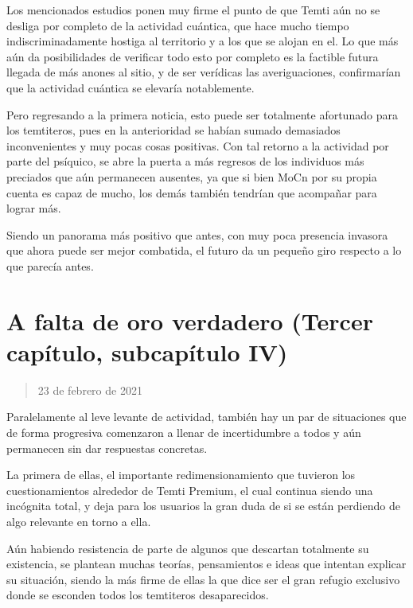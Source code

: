 \documentclass[
  spanish,
]{book}
\begin{document}
Los mencionados estudios ponen muy firme el punto de que Temti aún no se desliga por completo de la actividad cuántica, que hace mucho tiempo indiscriminadamente hostiga al territorio y a los que se alojan en el. Lo que más aún da posibilidades de verificar todo esto por completo es la factible futura llegada de más anones al sitio, y de ser verídicas las averiguaciones, confirmarían que la actividad cuántica se elevaría notablemente.

Pero regresando a la primera noticia, esto puede ser totalmente afortunado para los temtiteros, pues en la anterioridad se habían sumado demasiados inconvenientes y muy pocas cosas positivas. Con tal retorno a la actividad por parte del psíquico, se abre la puerta a más regresos de los individuos más preciados que aún permanecen ausentes, ya que si bien MoCn por su propia cuenta es capaz de mucho, los demás también tendrían que acompañar para lograr más.

Siendo un panorama más positivo que antes, con muy poca presencia invasora que ahora puede ser mejor combatida, el futuro da un pequeño giro respecto a lo que parecía antes.

\hypertarget{a-falta-de-oro-verdadero-tercer-capuxedtulo-subcapuxedtulo-iv}{%
\section{A falta de oro verdadero (Tercer capítulo, subcapítulo IV)}\label{a-falta-de-oro-verdadero-tercer-capuxedtulo-subcapuxedtulo-iv}}

\begin{quote}
23 de febrero de 2021
\end{quote}

Paralelamente al leve levante de actividad, también hay un par de situaciones que de forma progresiva comenzaron a llenar de incertidumbre a todos y aún permanecen sin dar respuestas concretas.

La primera de ellas, el importante redimensionamiento que tuvieron los cuestionamientos alrededor de Temti Premium, el cual continua siendo una incógnita total, y deja para los usuarios la gran duda de si se están perdiendo de algo relevante en torno a ella.

Aún habiendo resistencia de parte de algunos que descartan totalmente su existencia, se plantean muchas teorías, pensamientos e ideas que intentan explicar su situación, siendo la más firme de ellas la que dice ser el gran refugio exclusivo donde se esconden todos los temtiteros desaparecidos.
\end{document}
